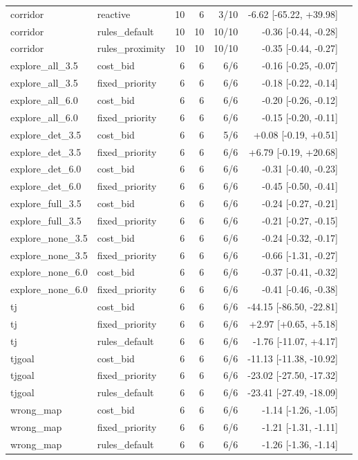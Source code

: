 \documentclass[journal,onecolumn]{IEEEtran}
\begin{document}
{\begin{longtable}{@{}llrrrrl@{}}
corridor & reactive & 10 & 6 & 3/10 & -6.62 [-65.22, +39.98] \\
corridor & rules\_default & 10 & 10 & 10/10 & -0.36 [-0.44, -0.28] \\
corridor & rules\_proximity & 10 & 10 & 10/10 & -0.35 [-0.44, -0.27] \\
explore\_all\_3.5 & cost\_bid & 6 & 6 & 6/6 & -0.16 [-0.25, -0.07] \\
explore\_all\_3.5 & fixed\_priority & 6 & 6 & 6/6 & -0.18 [-0.22, -0.14] \\
explore\_all\_6.0 & cost\_bid & 6 & 6 & 6/6 & -0.20 [-0.26, -0.12] \\
explore\_all\_6.0 & fixed\_priority & 6 & 6 & 6/6 & -0.15 [-0.20, -0.11] \\
explore\_det\_3.5 & cost\_bid & 6 & 6 & 5/6 & +0.08 [-0.19, +0.51] \\
explore\_det\_3.5 & fixed\_priority & 6 & 6 & 6/6 & +6.79 [-0.19, +20.68] \\
explore\_det\_6.0 & cost\_bid & 6 & 6 & 6/6 & -0.31 [-0.40, -0.23] \\
explore\_det\_6.0 & fixed\_priority & 6 & 6 & 6/6 & -0.45 [-0.50, -0.41] \\
explore\_full\_3.5 & cost\_bid & 6 & 6 & 6/6 & -0.24 [-0.27, -0.21] \\
explore\_full\_3.5 & fixed\_priority & 6 & 6 & 6/6 & -0.21 [-0.27, -0.15] \\
explore\_none\_3.5 & cost\_bid & 6 & 6 & 6/6 & -0.24 [-0.32, -0.17] \\
explore\_none\_3.5 & fixed\_priority & 6 & 6 & 6/6 & -0.66 [-1.31, -0.27] \\
explore\_none\_6.0 & cost\_bid & 6 & 6 & 6/6 & -0.37 [-0.41, -0.32] \\
explore\_none\_6.0 & fixed\_priority & 6 & 6 & 6/6 & -0.41 [-0.46, -0.38] \\
tj & cost\_bid & 6 & 6 & 6/6 & -44.15 [-86.50, -22.81] \\
tj & fixed\_priority & 6 & 6 & 6/6 & +2.97 [+0.65, +5.18] \\
tj & rules\_default & 6 & 6 & 6/6 & -1.76 [-11.07, +4.17] \\
tjgoal & cost\_bid & 6 & 6 & 6/6 & -11.13 [-11.38, -10.92] \\
tjgoal & fixed\_priority & 6 & 6 & 6/6 & -23.02 [-27.50, -17.32] \\
tjgoal & rules\_default & 6 & 6 & 6/6 & -23.41 [-27.49, -18.09] \\
wrong\_map & cost\_bid & 6 & 6 & 6/6 & -1.14 [-1.26, -1.05] \\
wrong\_map & fixed\_priority & 6 & 6 & 6/6 & -1.21 [-1.31, -1.11] \\
wrong\_map & rules\_default & 6 & 6 & 6/6 & -1.26 [-1.36, -1.14] \\
\bottomrule
\end{longtable}}
\end{document}
